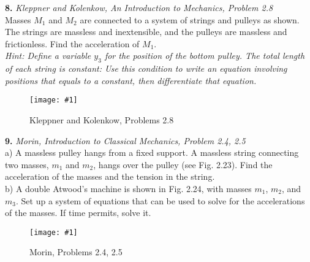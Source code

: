 \documentclass[11pt]{article}
\newcommand{\fig}[4]{
    \begin{figure}[H]
        \centering
        \texttt{[image: \#1]}
        \caption{#2}
        \label{exp4fit}
    \end{figure}
}
\theoremstyle{gangnamstyle}{\newtheorem{definition}{Definition}[]}
\theoremstyle{gangnamstyle}{\newtheorem{example}{Example}[]}
\theoremstyle{gangnamstyle}{\newtheorem{problem}{Problem}[]}
\begin{document}


\textbf{8.} \textit{Kleppner and Kolenkow, An Introduction to Mechanics, Problem 2.8} \\
Masses $M_1$ and $M_2$ are connected to a system of strings and pulleys as shown. The strings are massless and inextensible, and the pulleys are massless and frictionless. Find the acceleration of $M_1$. \\
\textit{Hint: Define a variable $y_3$ for the position of the bottom pulley. The total length of each string is constant: Use this condition to write an equation involving positions that equals to a constant, then differentiate that equation.}
\fig{figs/0625/kk28.png}{Kleppner and Kolenkow, Problems 2.8}{0.6}{0}

\pagebreak

\textbf{9.} \textit{Morin, Introduction to Classical Mechanics, Problem 2.4, 2.5} \\
a) A massless pulley hangs from a fixed support. A massless string connecting
two masses, $m_1$ and $m_2$, hangs over the pulley (see Fig. 2.23). Find the acceleration of the masses and the tension in the string. \\
b) A double Atwood’s machine is shown in Fig. 2.24, with masses $m_1$, $m_2$, and $m_3$. Set up a system of equations that can be used to solve for the accelerations of the masses. If time permits, solve it. 
\fig{figs/0625/morin245.png}{Morin, Problems 2.4, 2.5}{0.75}{0}
\end{document}
